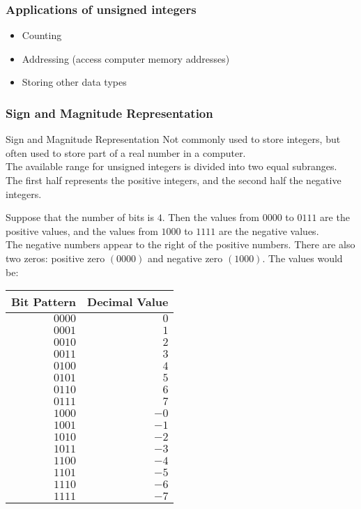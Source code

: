 \documentclass[\main/notes.tex]{subfiles}
\begin{document}
				\subsubsection{Applications of unsigned integers}
					\begin{itemize}
						\item Counting
						\item Addressing (access computer memory addresses)
						\item Storing other data types
					\end{itemize}
				\subsubsection{Sign and Magnitude Representation}
					\begin{definition}{Sign and Magnitude Representation}
						Not commonly used to store integers, but often used to store part of a real number in a computer.\\
						The available range for unsigned integers is divided into two equal subranges. The first half represents the positive integers, and the second half the negative integers.
					\end{definition}
					\begin{example}
						Suppose that the number of bits is $4$. Then the values from $0000$ to $0111$ are the positive values, and the values from $1000$ to $1111$ are the negative values.\\
						The negative numbers appear to the right of the positive numbers. There are also two zeros: positive zero $(0000)$ and negative zero $(1000)$.
						The values would be:
						\begin{center}
							\begin{tabular}{rr}
								\toprule
								Bit Pattern & Decimal Value\\
								\midrule
								$0000$ & $0$\\
								$0001$ & $1$\\
								$0010$ & $2$\\
								$0011$ & $3$\\
								$0100$ & $4$\\
								$0101$ & $5$\\
								$0110$ & $6$\\
								$0111$ & $7$\\
								$1000$ & $-0$\\
								$1001$ & $-1$\\
								$1010$ & $-2$\\
								$1011$ & $-3$\\
								$1100$ & $-4$\\
								$1101$ & $-5$\\
								$1110$ & $-6$\\
								$1111$ & $-7$\\
								\bottomrule
							\end{tabular}
						\end{center}
					\end{example}
\end{document}
